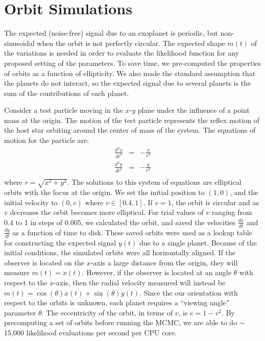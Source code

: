 \documentclass[useAMS,usenatbib]{mn2e}
\begin{document}
\section{Orbit Simulations}\label{sec:orbits}
The expected (noise-free) signal due to an exoplanet is periodic, but
non-sinusoidal when the orbit is not perfectly circular. The expected
shape $m(t)$ of the variations is needed in order to evaluate the likelihood
function for any proposed setting of the parameters.
To save time, we pre-computed the properties of orbits as a function of
ellipticity. We also made the standard assumption that the planets do not
interact, so the expected signal due to several planets is the sum of the
contributions of each planet.

Consider a test particle moving in the $x$-$y$ plane under the influence of a
point mass at the origin. The motion of the test particle represents the
reflex motion of the host star orbiting around the center of mass of the
system. The equations of motion for the particle are:
\begin{eqnarray}
\frac{d^2x}{dt^2} &=& -\frac{x}{r^3} \\
\frac{d^2y}{dt^2} &=& -\frac{y}{r^3} \\
\end{eqnarray}
where $r = \sqrt{x^2 + y^2}$. The solutions to this system of equations are elliptical orbits
with the focus at the origin. We set the initial position to $(1, 0)$, and
the initial velocity to $(0, v)$ where $v \in [0.4, 1]$.
If $v=1$, the orbit is circular and as $v$ decreases the orbit becomes more
elliptical. For trial values of $v$ ranging from 0.4 to 1 in steps of 0.005,
we calculated the orbit, and saved the
velocities $\frac{dx}{dt}$ and $\frac{dy}{dt}$ as a function of time to disk.
These saved orbits were used as a lookup table for constructing the expected
signal $y(t)$ due to a single planet.
Because of the initial conditions, the simulated orbits were all horizontally
aligned. If the observer is located on the $x$-axis a large distance
from the origin, they will measure $m(t) = \dot{x}(t)$. However, if the
observer is located at an angle $\theta$ with respect to the $x$-axis, then
the radial velocity measured will instead be
$m(t) = \cos(\theta)\dot{x}(t) + \sin(\theta)\dot{y}(t)$.
Since the our orientation with respect to the orbits is unknown, each planet
requires a ``viewing angle'' parameter $\theta$.
The eccentricity of the orbit, in terms of $v$, is $e = 1 - v^2$.
By precomputing a set of orbits before running the MCMC, we are able to
do $\sim$ 15,000 likelihood evaluations per second per CPU core.
\end{document}
